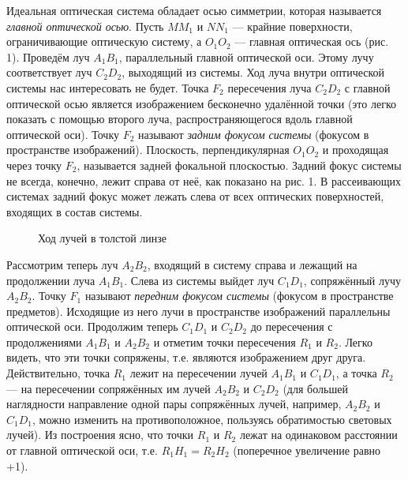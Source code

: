 \documentclass[14pt]{article}
\begin{document}
Идеальная оптическая система обладает осью симметрии, которая
называется \textsl{главной оптической осью}. Пусть $MM_1$ и $NN_1$ — крайние
поверхности, ограничивающие оптическую систему, а $O_1O_2$ — главная
оптическая ось (рис. 1). Проведём луч $A_1B_1$, параллельный главной оптической
оси. Этому лучу соответствует луч $C_2D_2$, выходящий из системы.
Ход луча внутри оптической системы нас интересовать не будет.
Точка $F_2$ пересечения луча $C_2D_2$ с главной оптической осью является
изображением бесконечно удалённой точки (это легко показать с помощью
второго луча, распространяющегося вдоль главной оптической
оси). Точку $F_2$ называют \textsl{задним фокусом системы} (фокусом в пространстве
изображений). Плоскость, перпендикулярная $O_1O_2$ и проходящая
через точку $F_2$, называется задней фокальной плоскостью. Задний фокус системы не всегда,
конечно, лежит справа от неё,
как показано на
рис. 1.
В рассеивающих системах задний фокус может лежать слева от
всех оптических поверхностей, входящих в состав системы.

\begin{figure}[h!]
	\caption{Ход лучей в толстой линзе}
	\label{fig:image}
\end{figure}

Рассмотрим теперь луч $A_2B_2$,
входящий в систему справа
и
лежащий на продолжении луча
$A_1B_1$. Слева из системы выйдет луч
$C_1D_1$, сопряжённый лучу $A_2B_2$. Точку
$F_1$ называют \textsl{передним фокусом системы} (фокусом
в пространстве предметов).
Исходящие из него лучи
в пространстве изображений параллельны
оптической оси. Продолжим
теперь $C_1D_1$ и $C_2D_2$ до пересечения с продолжениями
$A_1B_1$ и $A_2B_2$ и отметим точки пересечения $R_1$ и
$R_2$. Легко видеть, что эти точки
сопряжены, т.е. являются изображением друг друга. Действительно,
точка
$R_1$ лежит на пересечении лучей
$A_1B_1$ и
$C_1D_1$, а точка $R_2$ — на
пересечении сопряжённых им лучей
$A_2B_2$ и
$C_2D_2$ (для большей наглядности
направление одной пары сопряжённых лучей, например,
$A_2B_2$
и
$C_1D_1$, можно изменить на противоположное, пользуясь обратимостью
световых лучей). Из построения ясно, что точки
$R_1$ и
$R_2$ лежат на одинаковом
расстоянии от главной оптической оси, т.е.
$R_1H_1 = R_2H_2$ (поперечное
увеличение равно +1).
\end{document}
